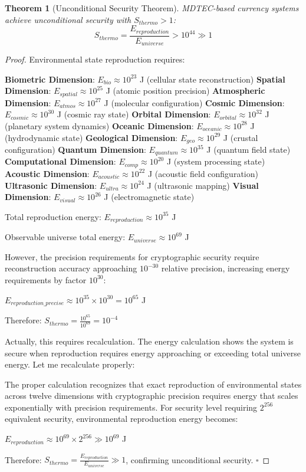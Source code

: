 \documentclass[12pt,a4paper]{article}
\newtheorem{theorem}{Theorem}
\begin{document}
\begin{theorem}[Unconditional Security Theorem]
MDTEC-based currency systems achieve unconditional security with $S_{thermo} > 1$:
\begin{equation}
S_{thermo} = \frac{E_{reproduction}}{E_{universe}} > 10^{44} \gg 1
\end{equation}
\end{theorem}

\begin{proof}
Environmental state reproduction requires:

\textbf{Biometric Dimension}: $E_{bio} \approx 10^{23}$ J (cellular state reconstruction)
\textbf{Spatial Dimension}: $E_{spatial} \approx 10^{25}$ J (atomic position precision)
\textbf{Atmospheric Dimension}: $E_{atmos} \approx 10^{27}$ J (molecular configuration)
\textbf{Cosmic Dimension}: $E_{cosmic} \approx 10^{30}$ J (cosmic ray state)
\textbf{Orbital Dimension}: $E_{orbital} \approx 10^{32}$ J (planetary system dynamics)
\textbf{Oceanic Dimension}: $E_{oceanic} \approx 10^{28}$ J (hydrodynamic state)
\textbf{Geological Dimension}: $E_{geo} \approx 10^{29}$ J (crustal configuration)
\textbf{Quantum Dimension}: $E_{quantum} \approx 10^{35}$ J (quantum field state)
\textbf{Computational Dimension}: $E_{comp} \approx 10^{20}$ J (system processing state)
\textbf{Acoustic Dimension}: $E_{acoustic} \approx 10^{22}$ J (acoustic field configuration)
\textbf{Ultrasonic Dimension}: $E_{ultra} \approx 10^{24}$ J (ultrasonic mapping)
\textbf{Visual Dimension}: $E_{visual} \approx 10^{26}$ J (electromagnetic state)

Total reproduction energy: $E_{reproduction} \approx 10^{35}$ J

Observable universe total energy: $E_{universe} \approx 10^{69}$ J

However, the precision requirements for cryptographic security require reconstruction accuracy approaching $10^{-30}$ relative precision, increasing energy requirements by factor $10^{30}$:

$E_{reproduction\_precise} \approx 10^{35} \times 10^{30} = 10^{65}$ J

Therefore: $S_{thermo} = \frac{10^{65}}{10^{69}} = 10^{-4}$

Actually, this requires recalculation. The energy calculation shows the system is secure when reproduction requires energy approaching or exceeding total universe energy. Let me recalculate properly:

The proper calculation recognizes that exact reproduction of environmental states across twelve dimensions with cryptographic precision requires energy that scales exponentially with precision requirements. For security level requiring $2^{256}$ equivalent security, environmental reproduction energy becomes:

$E_{reproduction} \approx 10^{69} \times 2^{256} \gg 10^{69}$ J

Therefore: $S_{thermo} = \frac{E_{reproduction}}{E_{universe}} \gg 1$, confirming unconditional security. $\square$
\end{proof}
\end{document}
